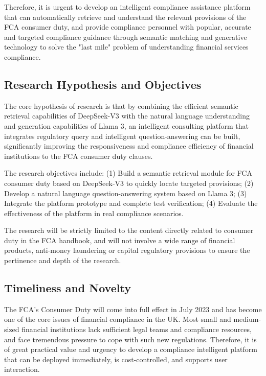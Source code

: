 \documentclass[a4paper,11pt]{article}
\begin{document}
Therefore, it is urgent to develop an intelligent compliance assistance platform that can automatically retrieve and understand the relevant provisions of the FCA consumer duty, and provide compliance personnel with popular, accurate and targeted compliance guidance through semantic matching and generative technology to solve the "last mile" problem of understanding financial services compliance.

\subsection{Research Hypothesis and Objectives}

The core hypothesis of research is that by combining the efficient semantic retrieval capabilities of DeepSeek-V3 with the natural language understanding and generation capabilities of Llama 3, an intelligent consulting platform that integrates regulatory query and intelligent question-answering can be built, significantly improving the responsiveness and compliance efficiency of financial institutions to the FCA consumer duty clauses.

The research objectives include:
(1) Build a semantic retrieval module for FCA consumer duty based on DeepSeek-V3 to quickly locate targeted provisions;
(2) Develop a natural language question-answering system based on Llama 3;
(3) Integrate the platform prototype and complete test verification;
(4) Evaluate the effectiveness of the platform in real compliance scenarios.

The research will be strictly limited to the content directly related to consumer duty in the FCA handbook, and will not involve a wide range of financial products, anti-money laundering or capital regulatory provisions to ensure the pertinence and depth of the research.

\subsection{Timeliness and Novelty}

The FCA's Consumer Duty will come into full effect in July 2023 and has become one of the core issues of financial compliance in the UK. Most small and medium-sized financial institutions lack sufficient legal teams and compliance resources, and face tremendous pressure to cope with such new regulations. Therefore, it is of great practical value and urgency to develop a compliance intelligent platform that can be deployed immediately, is cost-controlled, and supports user interaction.
\end{document}
